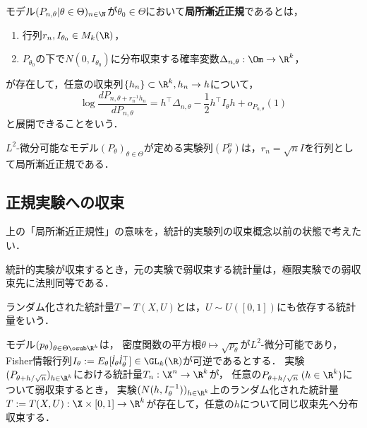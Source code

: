 \documentclass[uplatex,dvipdfmx]{jsreport}
\begin{document}
\begin{definition}
    モデル$(P_{n,\theta}|\theta\in\Theta)_{n\in\N}$が$\theta_0\in\Theta$において\textbf{局所漸近正規}であるとは，
    \begin{enumerate}
        \item 行列$r_n,I_{\theta_0}\in M_k(\R)$，
        \item $P_{\theta_0}$の下で$N(0,I_{\theta_0})$に分布収束する確率変数$\Delta_{n,\theta}:\Om\to\R^k$，
    \end{enumerate}
    が存在して，任意の収束列$\{h_n\}\subset\R^k,h_n\to h$について，
    \[\log\frac{dP_{n,\theta+r_n^{-1}h_n}}{dP_{n,\theta}}=h^\top\Delta_{n,\theta}-\frac{1}{2}h^\top I_\theta h+o_{P_{n,\theta}}(1)\]
    と展開できることをいう．
\end{definition}
\begin{example}
    $L^2$-微分可能なモデル$(P_\theta)_{\theta\in\Theta}$が定める実験列$(P^n_\theta)$は，$r_n=\sqrt{n}I$を行列として局所漸近正規である．
\end{example}

\subsection{正規実験への収束}

\begin{tcolorbox}[colframe=ForestGreen, colback=ForestGreen!10!white,breakable,colbacktitle=ForestGreen!40!white,coltitle=black,fonttitle=\bfseries\sffamily,
title=]
    上の「局所漸近正規性」の意味を，統計的実験列の収束概念以前の状態で考えたい．

\end{tcolorbox}

\begin{discussion}
    統計的実験が収束するとき，元の実験で弱収束する統計量は，極限実験での弱収束先に法則同等である．
\end{discussion}

\begin{definition}
    ランダム化された統計量$T=T(X,U)$とは，$U\sim U([0,1])$にも依存する統計量をいう．
\end{definition}

\begin{theorem}[正規実験へ収束するための十分条件]
    モデル$(p_\theta)_{\theta\in\Theta\osub\R^k}$は，
    密度関数の平方根$\theta\mapsto\sqrt{p_\theta}$が$L^2$-微分可能であり，Fisher情報行列$I_\theta:=E_\theta[\dot{l}_\theta\dot{l}_\theta^\top]\in\GL_k(\R)$が可逆であるとする．
    実験$(P_{\theta+h/\sqrt{n}})_{h\in\R^k}$における統計量$T_n:\X^n\to\R^k$が，
    任意の$P_{\theta+h/\sqrt{n}}\;(h\in\R^k)$について弱収束するとき，
    実験$(N(h,I^{-1}_{\theta}))_{h\in\R^k}$上のランダム化された統計量$T:=T(X,U):\X\times[0,1]\to\R^k$が存在して，任意の$h$について同じ収束先へ分布収束する．
\end{theorem}
\end{document}
